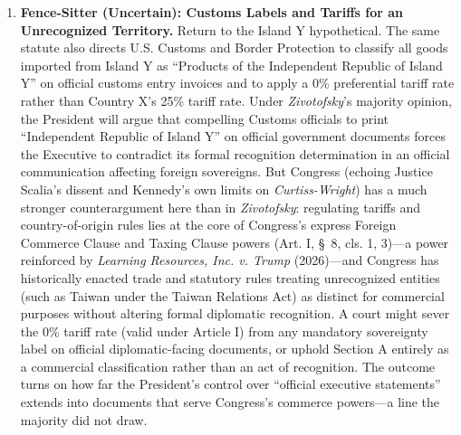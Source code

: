\documentclass[12pt]{article}
\begin{document}
\begin{enumerate}
\item \textbf{Fence-Sitter (Uncertain): Customs Labels and Tariffs for an Unrecognized Territory.} Return to the Island Y hypothetical. The same statute also directs U.S. Customs and Border Protection to classify all goods imported from Island Y as ``Products of the Independent Republic of Island Y'' on official customs entry invoices and to apply a 0\% preferential tariff rate rather than Country X's 25\% tariff rate. Under \textit{Zivotofsky}'s majority opinion, the President will argue that compelling Customs officials to print ``Independent Republic of Island Y'' on official government documents forces the Executive to contradict its formal recognition determination in an official communication affecting foreign sovereigns. But Congress (echoing Justice Scalia's dissent and Kennedy's own limits on \textit{Curtiss-Wright}) has a much stronger counterargument here than in \textit{Zivotofsky}: regulating tariffs and country-of-origin rules lies at the core of Congress's express Foreign Commerce Clause and Taxing Clause powers (Art. I, \S~8, cls. 1, 3)---a power reinforced by \textit{Learning Resources, Inc. v. Trump} (2026)---and Congress has historically enacted trade and statutory rules treating unrecognized entities (such as Taiwan under the Taiwan Relations Act) as distinct for commercial purposes without altering formal diplomatic recognition. A court might sever the 0\% tariff rate (valid under Article I) from any mandatory sovereignty label on official diplomatic-facing documents, or uphold Section A entirely as a commercial classification rather than an act of recognition. The outcome turns on how far the President's control over ``official executive statements'' extends into documents that serve Congress's commerce powers---a line the majority did not draw.

\end{enumerate}
\end{document}
